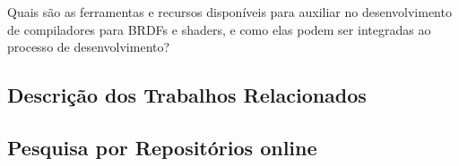 \documentclass[english, 
               brazil, 
               bsc] %
               {dcomp-abntex2}
\begin{document}
Quais são as ferramentas e recursos disponíveis para auxiliar no desenvolvimento de compiladores para BRDFs e shaders, e como elas podem ser integradas ao processo de desenvolvimento?

\subsection{Descrição dos Trabalhos Relacionados}

\subsection{Pesquisa por Repositórios online}





% 
% 
% 
% 
% 




\postextual

\renewcommand{\chapnumfont}{\chaptitlefont}
\renewcommand{\afterchapternum}{}


\end{document}

